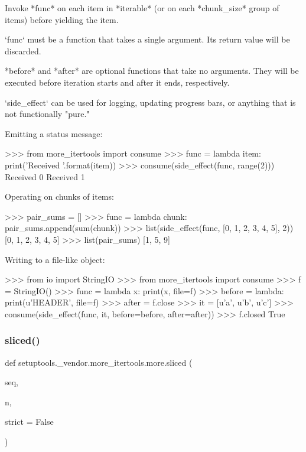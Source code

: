 \begin{DoxyVerb}Invoke *func* on each item in *iterable* (or on each *chunk_size* group
of items) before yielding the item.

`func` must be a function that takes a single argument. Its return value
will be discarded.

*before* and *after* are optional functions that take no arguments. They
will be executed before iteration starts and after it ends, respectively.

`side_effect` can be used for logging, updating progress bars, or anything
that is not functionally "pure."

Emitting a status message:

    >>> from more_itertools import consume
    >>> func = lambda item: print('Received {}'.format(item))
    >>> consume(side_effect(func, range(2)))
    Received 0
    Received 1

Operating on chunks of items:

    >>> pair_sums = []
    >>> func = lambda chunk: pair_sums.append(sum(chunk))
    >>> list(side_effect(func, [0, 1, 2, 3, 4, 5], 2))
    [0, 1, 2, 3, 4, 5]
    >>> list(pair_sums)
    [1, 5, 9]

Writing to a file-like object:

    >>> from io import StringIO
    >>> from more_itertools import consume
    >>> f = StringIO()
    >>> func = lambda x: print(x, file=f)
    >>> before = lambda: print(u'HEADER', file=f)
    >>> after = f.close
    >>> it = [u'a', u'b', u'c']
    >>> consume(side_effect(func, it, before=before, after=after))
    >>> f.closed
    True\end{DoxyVerb}
 \mbox{\label{namespacesetuptools_1_1__vendor_1_1more__itertools_1_1more_aef60074fb9074b75fdee79f9c5f330a5}} 
\subsubsection{\texorpdfstring{sliced()}{sliced()}}
{\footnotesize\ttfamily def setuptools.\+\_\+vendor.\+more\+\_\+itertools.\+more.\+sliced (\begin{DoxyParamCaption}\item[{}]{seq,  }\item[{}]{n,  }\item[{}]{strict = {\ttfamily False} }\end{DoxyParamCaption})}

